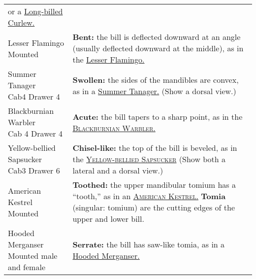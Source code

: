 \documentclass[10pt]{article}
\newif\ifprintkey
\newcommand{\PrintKey}[1]{\ifprintkey{\textbf{#1}}\fi}
\begin{document}
\begin{longtable}{@{}C{0.45\textwidth}L{0.45\textwidth}@{}}
or a \href{https://www.allaboutbirds.org/guide/Long-billed_Curlew}{Long-billed Curlew.} \\ [2.5cm]
%
\PrintKey{Lesser Flamingo \newline Mounted}%
& \textbf{Bent:} the bill is deflected downward at an angle (usually deflected downward at the middle), as in the \href{https://ebird.org/species/lesfla1}{Lesser Flamingo.} \\ [2.5cm]
%
\PrintKey{Summer Tanager \newline Cab4 Drawer 4} & 
\textbf{Swollen:} the sides of the mandibles are convex, as in a \href{https://www.allaboutbirds.org/guide/Summer_Tanager}{Summer Tanager.} (Show a dorsal view.)\\ [2.5cm]
%
\PrintKey{Blackburnian Warbler \newline Cab 4 Drawer 4} & 
\textbf{Acute:} the bill tapers to a sharp point, as in the \href{https://www.allaboutbirds.org/guide/Blackburnian_Warbler}{\textsc{Blackburnian Warbler.}} %
\\ [2.5cm]
%
\PrintKey{Yellow-bellied Sapsucker \newline Cab3 Drawer 6} & 
\textbf{Chisel-like:} the top of the bill is beveled, as in the \href{https://www.allaboutbirds.org/guide/Yellow-bellied_Sapsucker}{\textsc{Yellow-bellied Sapsucker}} %
(Show both a lateral and a dorsal view.) \\ [2.5cm]
%
\PrintKey{American Kestrel \newline Mounted} & 
\textbf{Toothed:} the upper mandibular tomium has a “tooth,” as in an \href{https://www.allaboutbirds.org/guide/American_Kestrel}{\textsc{American Kestrel.}} %
\textbf{Tomia} (singular: tomium) are the cutting edges of the upper and lower bill.\\ [2.5cm]
%
\PrintKey{Hooded Merganser \newline Mounted male and female} & 
\textbf{Serrate:} the bill has saw-like tomia, as in a \href{https://www.allaboutbirds.org/guide/Hooded_Merganser}{Hooded Merganser.} \\ [2.5cm]

\end{longtable}
\end{document}
